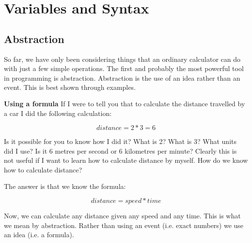 
\chapter{Variables and Syntax}

\section{Abstraction}

So far, we have only been considering things that an ordinary calculator can do with just a few simple
operations. The first and probably the most powerful tool in programming is abstraction. Abstraction
is the use of an idea rather than an event. This is best shown through examples.

\begin{example} \textbf{Using a formula}
If I were to tell you that to calculate the distance travelled by a car I did the following calculation:

\[ distance = 2 * 3 = 6 \]

Is it possible for you to know how I did it? What is 2? What is 3? What units did I use? Is it 6 metres
per second or 6 kilometres per minute? Clearly this is not useful if I want to learn how to calculate
distance by myself. How do we know how to calculate distance? 

The answer is that we know the formula:

\[ distance = speed * time \]

Now, we can calculate any distance given any speed and any time. This is what we mean by
abstraction. Rather than using an event (i.e. exact numbers) we use an idea (i.e. a formula).
\end{example}

